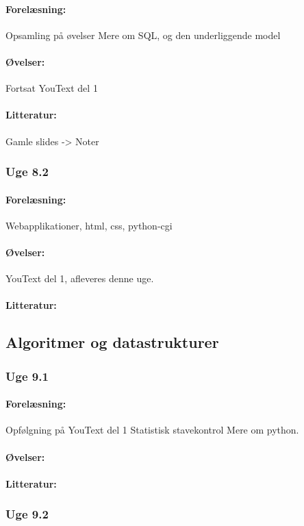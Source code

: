 \documentclass[12pt]{article}
\begin{document}
\paragraph{Forelæsning:} 
Opsamling på øvelser
Mere om SQL, og den underliggende model
\paragraph{Øvelser:}
Fortsat YouText del 1
\paragraph{Litteratur:} Gamle slides -> Noter 

\subsubsection{Uge 8.2}
\paragraph{Forelæsning:} 
Webapplikationer, html, css, python-cgi
\paragraph{Øvelser:}
YouText del 1, afleveres denne uge.
\paragraph{Litteratur:}

\subsection{Algoritmer og datastrukturer}
\subsubsection{Uge 9.1}
\paragraph{Forelæsning:}
Opfølgning på YouText del 1
Statistisk stavekontrol
Mere om python.
\paragraph{Øvelser:}
\paragraph{Litteratur:}

\subsubsection{Uge 9.2}
\end{document}
